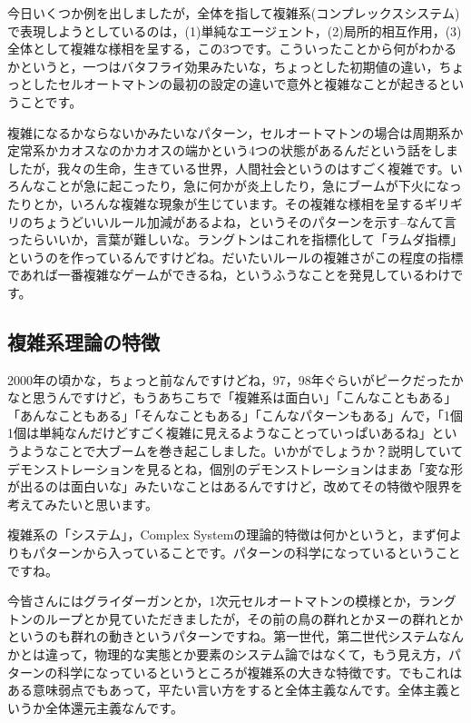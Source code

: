 \documentclass{ltjsbook}
\begin{document}
今日いくつか例を出しましたが，全体を指して複雑系(コンプレックスシステム)で表現しようとしているのは，(1)単純なエージェント，(2)局所的相互作用，(3)全体として複雑な様相を呈する，この3つです。こういったことから何がわかるかというと，一つはバタフライ効果みたいな，ちょっとした初期値の違い，ちょっとしたセルオートマトンの最初の設定の違いで意外と複雑なことが起きるということです。

複雑になるかならないかみたいなパターン，セルオートマトンの場合は周期系か定常系かカオスなのかカオスの端かという4つの状態があるんだという話をしましたが，我々の生命，生きている世界，人間社会というのはすごく複雑です。いろんなことが急に起こったり，急に何かが炎上したり，急にブームが下火になったりとか，いろんな複雑な現象が生じています。その複雑な様相を呈するギリギリのちょうどいいルール加減があるよね，というそのパターンを示す--なんて言ったらいいか，言葉が難しいな。ラングトンはこれを指標化して「ラムダ指標」というのを作っているんですけどね。だいたいルールの複雑さがこの程度の指標であれば一番複雑なゲームができるね，というふうなことを発見しているわけです。

\subsection{複雑系理論の特徴}
2000年の頃かな，ちょっと前なんですけどね，97，98年ぐらいがピークだったかなと思うんですけど，もうあちこちで「複雑系は面白い」「こんなこともある」「あんなこともある」「そんなこともある」「こんなパターンもある」んで，「1個1個は単純なんだけどすごく複雑に見えるようなことっていっぱいあるね」というようなことで大ブームを巻き起こしました。いかがでしょうか？説明していてデモンストレーションを見るとね，個別のデモンストレーションはまあ「変な形が出るのは面白いな」みたいなことはあるんですけど，改めてその特徴や限界を考えてみたいと思います。

複雑系の「システム」，Complex Systemの理論的特徴は何かというと，まず何よりもパターンから入っていることです。パターンの科学になっているということですね。

今皆さんにはグライダーガンとか，1次元セルオートマトンの模様とか，ラングトンのループとか見ていただきましたが，その前の鳥の群れとかヌーの群れとかというのも群れの動きというパターンですね。第一世代，第二世代システムなんかとは違って，物理的な実態とか要素のシステム論ではなくて，もう見え方，パターンの科学になっているというところが複雑系の大きな特徴です。でもこれはある意味弱点でもあって，平たい言い方をすると全体主義なんです。全体主義というか全体還元主義なんです。
\end{document}
